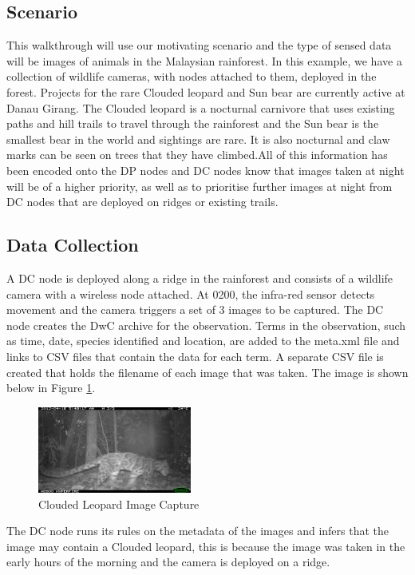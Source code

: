 		\subsection{Scenario}
			This walkthrough will use our motivating scenario and the type of sensed data will be images of animals in the Malaysian rainforest. In this example, we have a collection of wildlife cameras, with nodes attached to them, deployed in the forest. Projects for the rare Clouded leopard and Sun bear are currently active at Danau Girang. The Clouded leopard is a nocturnal carnivore that uses existing paths and hill trails to travel through the rainforest and the Sun bear is the smallest bear in the world and sightings are rare. It is also nocturnal and claw marks can be seen on trees that they have climbed.All of this information has been encoded onto the DP nodes and DC nodes know that images taken at night will be of a higher priority, as well as to prioritise further images at night from DC nodes that are deployed on ridges or existing trails.
			
		\subsection{Data Collection}
			A DC node is deployed along a ridge in the rainforest and consists of a wildlife camera with a wireless node attached. At 0200, the infra-red sensor detects movement and the camera triggers a set of 3 images to be captured. The DC node creates the DwC archive for the observation. Terms in the observation, such as time, date, species identified and location, are added to the meta.xml file and links to CSV files that contain the data for each term. A separate CSV file is created that holds the filename of each image that was taken. The image is shown below in Figure \ref{cl2}.
			
			\begin{figure}[!t]
			\centering
			\includegraphics[width=0.45\textwidth]{Chap4/figures/leopard2.JPG}
			\caption{Clouded Leopard Image Capture}
			\label{cl2}
			\end{figure}
			
			The DC node runs its rules on the metadata of the images and infers that the image may contain a Clouded leopard, this is because the image was taken in the early hours of the morning and the camera is deployed on a ridge.
			
